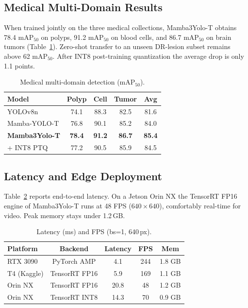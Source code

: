 \documentclass[10pt,twocolumn,letterpaper]{article}
\begin{document}
\subsection{Medical Multi-Domain Results}
When trained jointly on the three medical collections, Mamba3Yolo-T obtains 78.4 mAP\(_{50}\) on polyps, 91.2 mAP\(_{50}\) on blood cells, and 86.7 mAP\(_{50}\) on brain tumors (Table~\ref{tab:medical}). Zero-shot transfer to an unseen DR-lesion subset remains above 62 mAP\(_{50}\). After INT8 post-training quantization the average drop is only 1.1 points.

\begin{table}[t]
\centering
\caption{Medical multi-domain detection (mAP\(_{50}\)).}
\label{tab:medical}
\begin{tabular}{lcccc}
\toprule
Model & Polyp & Cell & Tumor & Avg \\
\midrule
YOLOv8n               & 74.1 & 88.3 & 82.5 & 81.6 \\
Mamba-YOLO-T          & 76.8 & 90.1 & 85.2 & 84.0 \\
\textbf{Mamba3Yolo-T} & \textbf{78.4} & \textbf{91.2} & \textbf{86.7} & \textbf{85.4} \\
\quad + INT8 PTQ      & 77.2 & 90.5 & 85.9 & 84.5 \\
\bottomrule
\end{tabular}
\end{table}

\subsection{Latency and Edge Deployment}
Table~\ref{tab:latency} reports end-to-end latency. On a Jetson Orin NX the TensorRT FP16 engine of Mamba3Yolo-T runs at 48 FPS (\(640\times640\)), comfortably real-time for video. Peak memory stays under 1.2\,GB.

\begin{table}[t]
\centering
\caption{Latency (ms) and FPS (bs=1, 640\,px).}
\label{tab:latency}
\begin{tabular}{lcccc}
\toprule
Platform & Backend & Latency & FPS & Mem \\
\midrule
RTX 3090     & PyTorch AMP    & 4.1  & 244 & 1.8 GB \\
T4 (Kaggle)  & TensorRT FP16  & 5.9  & 169 & 1.1 GB \\
Orin NX      & TensorRT FP16  & 20.8 & 48  & 1.2 GB \\
Orin NX      & TensorRT INT8  & 14.3 & 70  & 0.9 GB \\
\bottomrule
\end{tabular}
\end{table}
\end{document}
